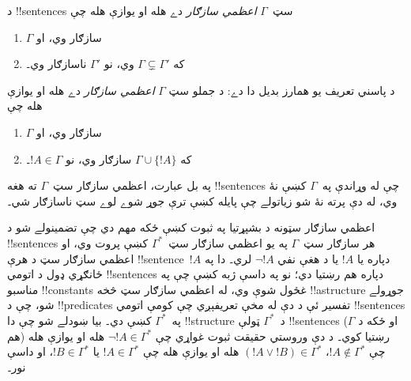 \documentclass[../../../include/open-logic-section]{subfiles}
\begin{document}

\begin{defn}
د !!{sentence}s سټ~$\Gamma$ \emph{اعظمي سازګار} دے هله او يوازې هله چې
\begin{enumerate}
\item $\Gamma$ سازګار وي، او
\item که $\Gamma \subsetneq \Gamma'$ وي، نو $\Gamma'$ ناسازګار وي۔
\end{enumerate}
\end{defn}

\begin{explain}
د پاسني تعريف يو همارز بديل دا دے: د جملو سټ $\Gamma$ \emph{اعظمي سازګار} دے هله او يوازې هله چې
\begin{enumerate}
\item $\Gamma$ سازګار وي، او
\item که $\Gamma \cup \{ !A \}$ سازګار وي، نو $!A \in \Gamma$۔
\end{enumerate}
په بل عبارت، اعظمي سازګار سټ~$\Gamma$ ته هغه !!{sentence}s چې له وړاندې په~$\Gamma$ کښې نۀ وي، له دې پرته نۀ شو زياتولے چې پايله کښې ترې جوړ شوے لوے سټ ناسازګار شي۔
\end{explain}

\begin{explain}
اعظمي سازګار سټونه د بشپړتيا په ثبوت کښې ځکه مهم دي چې تضمينولے شو د !!{sentence}s هر سازګار سټ~$\Gamma$ په يو اعظمي سازګار سټ~$\Gamma^*$ کښې پروت وي، او اعظمي سازګار سټ د هرې !!{sentence}~$!A$ دپاره يا $!A$ يا د هغې نفي $\lnot !A$ لري۔ دا په ځانګړي ډول د اتومي !!{sentence}s دپاره هم رښتيا دي؛ نو په داسې ژبه کښې چې په مناسبو !!{constant}s غځول شوې وي، له اعظمي سازګار سټ څخه !!a{structure} جوړولے شو، چې د !!{predicate}s تفسير ئې د دې له مخې تعريفېږي چې کومې اتومي !!{sentence}s په~$\Gamma^*$ کښې دي۔ بيا ښودلے شو چې دا !!{structure} د~$\Gamma^*$ ټولې !!{sentence}s (او ځکه د $\Gamma$ هم) رښتيا کوي۔ د دې وروستي حقيقت ثبوت غواړي چې $\lnot !A \in \Gamma^*$ هله او يوازې هله چې $!A \notin \Gamma^*$، $(!A \lor !B) \in \Gamma^*$ هله او يوازې هله چې $!A \in \Gamma^*$ يا $!B \in \Gamma^*$، او داسې نور۔
\end{explain}
\end{document}
